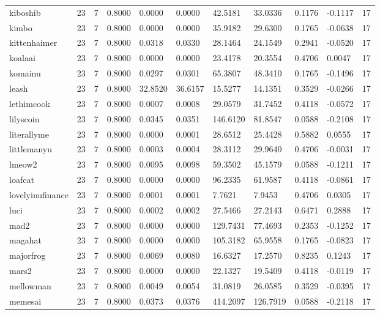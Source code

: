 \begin{table}[htbp]
\begin{tabular}{lllllllllll}
kiboshib & 23 & 7 & 0.8000 & 0.0000 & 0.0000 & 42.5181 & 33.0336 & 0.1176 & -0.1117 & 17 \\
kimbo & 23 & 7 & 0.8000 & 0.0000 & 0.0000 & 35.9182 & 29.6300 & 0.1765 & -0.0638 & 17 \\
kittenhaimer & 23 & 7 & 0.8000 & 0.0318 & 0.0330 & 28.1464 & 24.1549 & 0.2941 & -0.0520 & 17 \\
koalaai & 23 & 7 & 0.8000 & 0.0000 & 0.0000 & 23.4178 & 20.3554 & 0.4706 & 0.0047 & 17 \\
komainu & 23 & 7 & 0.8000 & 0.0297 & 0.0301 & 65.3807 & 48.3410 & 0.1765 & -0.1496 & 17 \\
leash & 23 & 7 & 0.8000 & 32.8520 & 36.6157 & 15.5277 & 14.1351 & 0.3529 & -0.0266 & 17 \\
lethimcook & 23 & 7 & 0.8000 & 0.0007 & 0.0008 & 29.0579 & 31.7452 & 0.4118 & -0.0572 & 17 \\
lilyscoin & 23 & 7 & 0.8000 & 0.0345 & 0.0351 & 146.6120 & 81.8547 & 0.0588 & -0.2108 & 17 \\
literallyme & 23 & 7 & 0.8000 & 0.0000 & 0.0001 & 28.6512 & 25.4428 & 0.5882 & 0.0555 & 17 \\
littlemanyu & 23 & 7 & 0.8000 & 0.0003 & 0.0004 & 28.3112 & 29.9640 & 0.4706 & -0.0031 & 17 \\
lmeow2 & 23 & 7 & 0.8000 & 0.0095 & 0.0098 & 59.3502 & 45.1579 & 0.0588 & -0.1211 & 17 \\
loafcat & 23 & 7 & 0.8000 & 0.0000 & 0.0000 & 96.2335 & 61.9587 & 0.4118 & -0.0861 & 17 \\
lovelyinufinance & 23 & 7 & 0.8000 & 0.0001 & 0.0001 & 7.7621 & 7.9453 & 0.4706 & 0.0305 & 17 \\
luci & 23 & 7 & 0.8000 & 0.0002 & 0.0002 & 27.5466 & 27.2143 & 0.6471 & 0.2888 & 17 \\
mad2 & 23 & 7 & 0.8000 & 0.0000 & 0.0000 & 129.7431 & 77.4693 & 0.2353 & -0.1252 & 17 \\
magahat & 23 & 7 & 0.8000 & 0.0000 & 0.0000 & 105.3182 & 65.9558 & 0.1765 & -0.0823 & 17 \\
majorfrog & 23 & 7 & 0.8000 & 0.0069 & 0.0080 & 16.6327 & 17.2570 & 0.8235 & 0.1243 & 17 \\
mars2 & 23 & 7 & 0.8000 & 0.0000 & 0.0000 & 22.1327 & 19.5409 & 0.4118 & -0.0119 & 17 \\
mellowman & 23 & 7 & 0.8000 & 0.0049 & 0.0054 & 31.0819 & 26.0585 & 0.3529 & -0.0395 & 17 \\
memesai & 23 & 7 & 0.8000 & 0.0373 & 0.0376 & 414.2097 & 126.7919 & 0.0588 & -0.2118 & 17 \\

\end{tabular}
\end{table}

